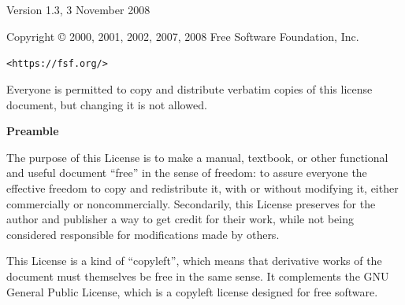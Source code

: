 



           
% 
\chapter*{}

 \begin{center}

       Version 1.3, 3 November 2008


 Copyright \copyright{} 2000, 2001, 2002, 2007, 2008  Free Software Foundation, Inc.
 
 \bigskip
 
     \texttt{<https://fsf.org/>}
  
 \bigskip
 
 Everyone is permitted to copy and distribute verbatim copies
 of this license document, but changing it is not allowed.
\end{center}


\begin{center}
{\bf\large Preamble}
\end{center}

The purpose of this License is to make a manual, textbook, or other
functional and useful document ``free'' in the sense of freedom: to
assure everyone the effective freedom to copy and redistribute it,
with or without modifying it, either commercially or noncommercially.
Secondarily, this License preserves for the author and publisher a way
to get credit for their work, while not being considered responsible
for modifications made by others.

This License is a kind of ``copyleft'', which means that derivative
works of the document must themselves be free in the same sense.  It
complements the GNU General Public License, which is a copyleft
license designed for free software.

